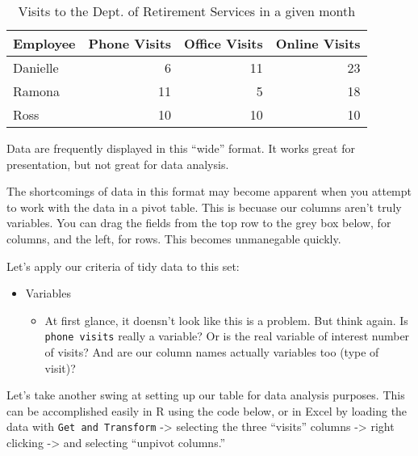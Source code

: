 \documentclass[]{book}
\newenvironment{Shaded}{\begin{snugshade}}{\end{snugshade}}
\newcommand{\KeywordTok}[1]{\textcolor[rgb]{0.13,0.29,0.53}{\textbf{#1}}}
\newcommand{\DataTypeTok}[1]{\textcolor[rgb]{0.13,0.29,0.53}{#1}}
\newcommand{\StringTok}[1]{\textcolor[rgb]{0.31,0.60,0.02}{#1}}
\newcommand{\OperatorTok}[1]{\textcolor[rgb]{0.81,0.36,0.00}{\textbf{#1}}}
\newcommand{\NormalTok}[1]{#1}
\providecommand{\tightlist}{%
  \setlength{\itemsep}{0pt}\setlength{\parskip}{0pt}}
\begin{document}
\begin{table}

\caption{\label{tab:tables-visits}Visits to the Dept. of Retirement Services in a given month}
\centering
\begin{tabular}[t]{l|r|r|r}
\hline
Employee & Phone Visits & Office Visits & Online Visits\\
\hline
Danielle & 6 & 11 & 23\\
\hline
Ramona & 11 & 5 & 18\\
\hline
Ross & 10 & 10 & 10\\
\hline
\end{tabular}
\end{table}

Data are frequently displayed in this ``wide'' format. It works great
for presentation, but not great for data analysis.

The shortcomings of data in this format may become apparent when you
attempt to work with the data in a pivot table. This is becuase our
columns aren't truly variables. You can drag the fields from the top row
to the grey box below, for columns, and the left, for rows. This becomes
unmanegable quickly.

\begin{Shaded}
\end{Shaded}

\hypertarget{htmlwidget-dc0275d8158601af18ad}{}

Let's apply our criteria of tidy data to this set:

\begin{itemize}
\tightlist
\item
  Variables

  \begin{itemize}
  \tightlist
  \item
    At first glance, it doensn't look like this is a problem. But think
    again. Is \texttt{phone\ visits} really a variable? Or is the real
    variable of interest number of visits? And are our column names
    actually variables too (type of visit)?
  \end{itemize}
\end{itemize}

Let's take another swing at setting up our table for data analysis
purposes. This can be accomplished easily in R using the code below, or
in Excel by loading the data with \texttt{Get\ and\ Transform}
-\textgreater{} selecting the three ``visits'' columns -\textgreater{}
right clicking -\textgreater{} and selecting ``unpivot columns.''
\end{document}
